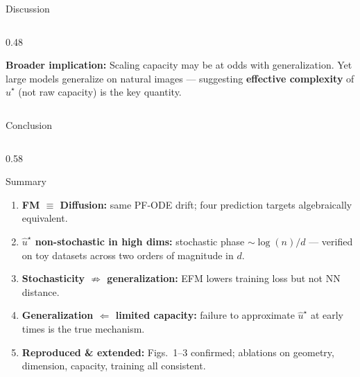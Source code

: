 \documentclass[10pt,aspectratio=169]{beamer}
\begin{document}
\begin{frame}{Discussion}
\begin{columns}[t]
\begin{column}{0.48\textwidth}
      \vspace{0.4em}
      \begin{warnbox}
        \small\textbf{Broader implication:}
        Scaling capacity may be at odds with generalization.
        Yet large models generalize on natural images ---
        suggesting \textbf{effective complexity} of $\hat{u}^\star$
        (not raw capacity) is the key quantity.
      \end{warnbox}
    \end{column}
  \end{columns}
\end{frame}

\begin{frame}{Conclusion}

  \begin{columns}[c]
    \begin{column}{0.58\textwidth}
      \begin{block}{Summary}
        \small
        \begin{enumerate}
          \item \textbf{FM $\equiv$ Diffusion:} same PF-ODE drift;
            four prediction targets algebraically equivalent.
          \item \textbf{$\hat{u}^\star$ non-stochastic in high dims:}
            stochastic phase $\sim\log(n)/d$ --- verified on
            toy datasets across two orders of magnitude in $d$.
          \item \textbf{Stochasticity $\not\Rightarrow$ generalization:}
            EFM lowers training loss but not NN distance.
          \item \textbf{Generalization $\Leftarrow$ limited capacity:}
            failure to approximate $\hat{u}^\star$ at early times
            is the true mechanism.
          \item \textbf{Reproduced \& extended:}
            Figs.~1--3 confirmed; ablations on geometry,
            dimension, capacity, training all consistent.
        \end{enumerate}
      \end{block}
    \end{column}


\end{columns}
\end{frame}
\end{document}
